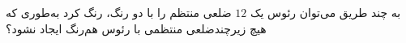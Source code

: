 \EXERCISE
به چند طریق می‌توان رئوس یک
$12$
ضلعی منتظم را با دو رنگ، رنگ کرد به‌طوری که هیچ زیرچندضلعی منتظمی با رئوس هم‌رنگ ایجاد نشود؟